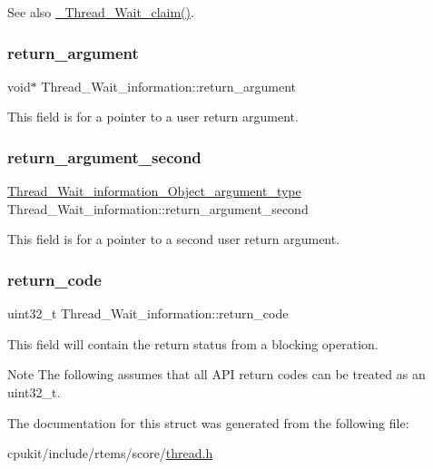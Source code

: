 \begin{DoxySeeAlso}{See also}
\mbox{\hyperlink{group__RTEMSScoreThread_ga032320598e809cb93d80e985906fb393}{\+\_\+\+Thread\+\_\+\+Wait\+\_\+claim()}}. 
\end{DoxySeeAlso}
\mbox{\label{structThread__Wait__information_ae0d09bf6f457e8ba3752e7c55bedad0c}} 
\subsubsection{\texorpdfstring{return\_argument}{return\_argument}}
{\footnotesize\ttfamily void$\ast$ Thread\+\_\+\+Wait\+\_\+information\+::return\+\_\+argument}

This field is for a pointer to a user return argument. \mbox{\label{structThread__Wait__information_a8fcafd2a99ad39bb63c40dbf74131e6f}} 
\subsubsection{\texorpdfstring{return\_argument\_second}{return\_argument\_second}}
{\footnotesize\ttfamily \mbox{\hyperlink{unionThread__Wait__information__Object__argument__type}{Thread\+\_\+\+Wait\+\_\+information\+\_\+\+Object\+\_\+argument\+\_\+type}} Thread\+\_\+\+Wait\+\_\+information\+::return\+\_\+argument\+\_\+second}

This field is for a pointer to a second user return argument. \mbox{\label{structThread__Wait__information_ae0bd8a5d994cd9a126073eb301c75a86}} 
\subsubsection{\texorpdfstring{return\_code}{return\_code}}
{\footnotesize\ttfamily uint32\+\_\+t Thread\+\_\+\+Wait\+\_\+information\+::return\+\_\+code}

This field will contain the return status from a blocking operation.

\begin{DoxyNote}{Note}
The following assumes that all A\+PI return codes can be treated as an uint32\+\_\+t. 
\end{DoxyNote}


The documentation for this struct was generated from the following file\+:\begin{DoxyCompactItemize}
\item 
cpukit/include/rtems/score/\mbox{\hyperlink{score_2thread_8h}{thread.\+h}}\end{DoxyCompactItemize}
